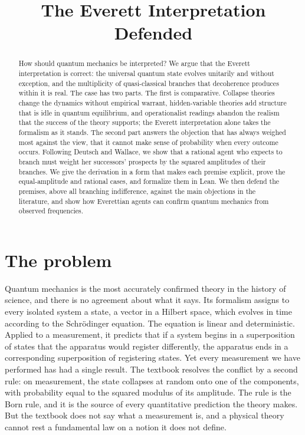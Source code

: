 \documentclass{situationist-preprint}
\title{The Everett Interpretation Defended}
\begin{document}
\maketitle

\begin{abstract}
How should quantum mechanics be interpreted? We argue that the Everett interpretation is correct: the universal quantum state evolves unitarily and without exception, and the multiplicity of quasi-classical branches that decoherence produces within it is real. The case has two parts. The first is comparative. Collapse theories change the dynamics without empirical warrant, hidden-variable theories add structure that is idle in quantum equilibrium, and operationalist readings abandon the realism that the success of the theory supports; the Everett interpretation alone takes the formalism as it stands. The second part answers the objection that has always weighed most against the view, that it cannot make sense of probability when every outcome occurs. Following Deutsch and Wallace, we show that a rational agent who expects to branch must weight her successors' prospects by the squared amplitudes of their branches. We give the derivation in a form that makes each premise explicit, prove the equal-amplitude and rational cases, and formalize them in Lean. We then defend the premises, above all branching indifference, against the main objections in the literature, and show how Everettian agents can confirm quantum mechanics from observed frequencies.
\end{abstract}

\section{The problem}\label{s:problem}

Quantum mechanics is the most accurately confirmed theory in the history of science, and there is no agreement about what it says. Its formalism assigns to every isolated system a state, a vector in a Hilbert space, which evolves in time according to the Schrödinger equation. The equation is linear and deterministic. Applied to a measurement, it predicts that if a system begins in a superposition of states that the apparatus would register differently, the apparatus ends in a corresponding superposition of registering states. Yet every measurement we have performed has had a single result. The textbook resolves the conflict by a second rule: on measurement, the state collapses at random onto one of the components, with probability equal to the squared modulus of its amplitude. The rule is the Born rule, and it is the source of every quantitative prediction the theory makes. But the textbook does not say what a measurement is, and a physical theory cannot rest a fundamental law on a notion it does not define.
\end{document}
